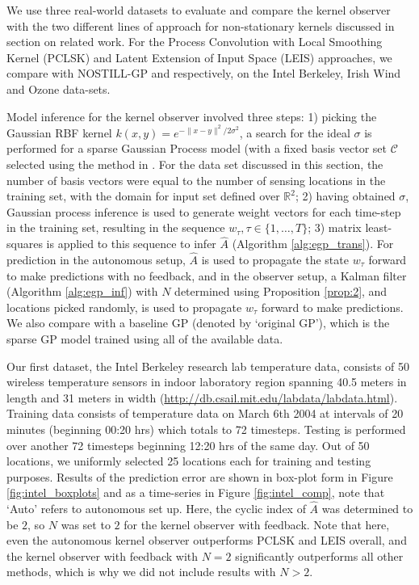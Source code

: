 \documentclass[letterpaper,12pt,peerreviewca,draftcls]{IEEEtran}
\newcommand{\s}{\sigma}
\newcommand{\R}{\mathbb{R}}
\newcommand{\weight}{w}
\newcommand{\kernel}{k}
\newcommand{\nsamp}{N}
\newcommand{\shCent}{\mathcal{C}}
\newcommand{\dualop}{A}
\newcommand{\dualopApprox}{\widehat{\dualop}}
\newcommand{\tindex}{\tau}
\begin{document}
We use three real-world datasets to evaluate and compare the kernel observer with the two different lines of approach for non-stationary kernels  discussed in section on related work. %
For the Process Convolution with Local Smoothing Kernel (PCLSK) and Latent Extension of Input Space (LEIS) approaches, we compare with NOSTILL-GP \cite{garg2012AAAI} and \cite{pfingsten2006nonstationary} respectively, on the Intel Berkeley, Irish Wind and Ozone data-sets. 

Model inference for the kernel observer involved three steps: 1) picking the Gaussian RBF kernel $\kernel(x,y) = e^{-\|x-y\|^2/2\s^2}$, a search for the ideal $\s$ is performed for a sparse Gaussian Process model (with a fixed basis vector set $\shCent$ selected using the method in \cite{csato2002sparse}. %
{For the data set discussed in this section, the number of basis vectors were equal to the number of sensing locations in the training set, with the domain for input set defined over $ \R^2 $}; 2) having obtained $\s$, Gaussian process inference is used to generate weight vectors for each time-step in the training set, resulting in the sequence $\weight_\tindex, \tindex\in\{1,\dots,T\}$; 3) matrix least-squares is applied to this sequence to infer $\dualopApprox$ (Algorithm \ref{alg:egp_trans}). For prediction in the autonomous setup, $\dualopApprox$ is used to propagate the state $\weight_{\tindex}$ forward to make predictions with no feedback, and in the observer setup, a Kalman filter (Algorithm \ref{alg:egp_inf}) with $\nsamp$ determined using Proposition \ref{prop:2}, and locations picked randomly, is used to propagate $\weight_{\tindex}$ forward to make predictions. We also compare with a baseline GP (denoted by `original GP'), which is the sparse GP model trained using all of the available data. 

Our first dataset, the Intel Berkeley research lab temperature data, consists of 50 wireless temperature sensors in indoor laboratory region spanning 40.5 meters in length and 31 meters in width ({\url{http://db.csail.mit.edu/labdata/labdata.html}}). Training data consists of temperature data on March 6th 2004 at intervals of 20 minutes (beginning 00:20 hrs) which totals to 72 timesteps. Testing is performed over another 72 timesteps beginning 12:20 hrs of the same day. Out of 50 locations, we uniformly selected 25 locations each for training and testing purposes. Results of the prediction error are shown in box-plot form in Figure \ref{fig:intel_boxplots} and as a time-series in Figure \ref{fig:intel_comp}, note that `Auto' refers to autonomous set up. Here, the cyclic index of $\dualopApprox$ was determined to be $2$, so $\nsamp$ was set to $2$ for the kernel observer with feedback. Note that here, even the autonomous kernel observer outperforms PCLSK and LEIS overall, and the kernel observer with feedback with $\nsamp = 2$ significantly outperforms all other methods, which is why we did not include results with $\nsamp > 2$. 
\end{document}
